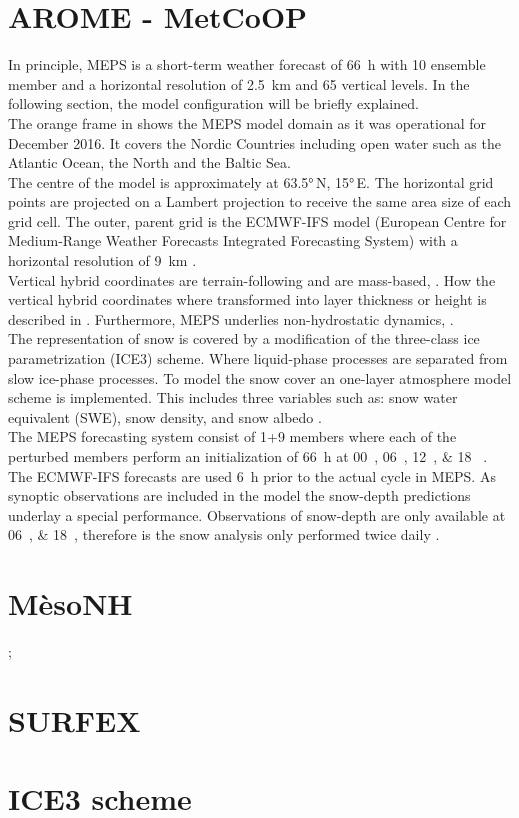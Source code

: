\section{AROME - MetCoOP}
\label{sec:MEPS}
In principle, MEPS is a short-term weather forecast of \SI{66}{\hour} with 10 ensemble member and a horizontal resolution of \SI{2.5}{\km} and 65 vertical levels. In the following section, the model configuration will be briefly explained. %
\\
The orange frame in  shows the MEPS model domain as it was operational for December 2016. It covers the Nordic Countries including open water such as the Atlantic Ocean, the North and the Baltic Sea.  
\\
The centre of the model is approximately at \ang{63.5}\,N, \ang{15}\,E. 
The horizontal grid points are projected on a Lambert projection to receive the same area size of each grid cell. 
The outer, parent grid is the ECMWF-IFS model (European Centre for Medium-Range Weather Forecasts Integrated Forecasting System) with a horizontal resolution of \SI{9}{\km} \citep{homleid_verification_2016}. 
\\
Vertical hybrid coordinates are terrain-following and are mass-based, \citep{muller_arome-metcoop:_2017}. How the vertical hybrid coordinates where transformed into layer thickness or height is described in . Furthermore, MEPS underlies non-hydrostatic dynamics, \cite{metcoop_wiki_description_2017}.
\\
The representation of snow is covered by a modification of the three-class ice parametrization (ICE3) scheme. Where liquid-phase processes are separated from slow ice-phase processes. To model the snow cover an one-layer atmosphere model scheme is implemented. This includes three variables such as: snow water equivalent (SWE), snow density, and snow albedo \citep{muller_arome-metcoop:_2017}.
\\
The MEPS forecasting system consist of 1+9 members where each of the perturbed members perform an initialization of \SI{66}{\hour} at \SIlist{00;06;12;18}{\UTC} \citep{metcoop_wiki_description_2017}. The ECMWF-IFS forecasts are used \SI{6}{\hour} prior to the actual cycle in MEPS. As synoptic observations are included in the model the snow-depth predictions underlay a special performance. Observations of snow-depth are only available at \SIlist{06;18}{\UTC}, therefore is the snow analysis only performed twice daily \citep{muller_arome-metcoop:_2017, homleid_verification_2016}. 

\section{MèsoNH}
\cite{meteo_france_meso-nh_2009}; 
\cite{seity_arome-france_2010}
\section{SURFEX}
\cite{masson_surfexv7.2_2013}
\section{ICE3 scheme}
\cite{pinty_mixed-phased_1998}
